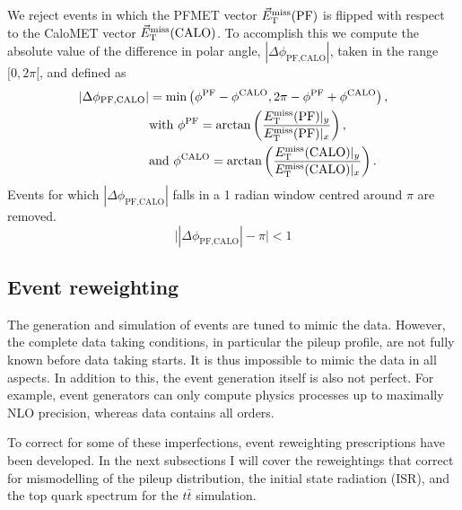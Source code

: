 We reject events in which the PFMET vector ${\vec E}_{\mathrm{T}}^{\text{miss}}(\textrm{PF})$ is flipped with
respect to the CaloMET vector ${\vec E}_{\mathrm{T}}^{\text{miss}}(\textrm{CALO})$. 
To accomplish this we compute the absolute value of the difference in polar angle,
 $|\Delta\phi_{\textrm{PF,CALO}}|$, taken in the range $[0,2\pi[$, and defined as
\begin{align}
|\Delta\phi_{\textrm{PF,CALO}}| &= \min \left ( \phi^{\textrm{PF}} - \phi^{\textrm{CALO}},   2\pi -
\phi^{\textrm{PF}} + \phi^{\textrm{CALO}} \right) ,\\
&\textrm{with } \phi^{\textrm{PF}} = \textrm{arctan} \left( \frac{E_{\mathrm{T}}^{\text{miss}}(\textrm{PF})|_y}
{E_{\mathrm{T}}^{\text{miss}}(\textrm{PF})|_x} \right) , \\
&\textrm{and } \phi^{\textrm{CALO}} = \textrm{arctan}\left( \frac{E_{\mathrm{T}}^{\text{miss}}(\textrm{CALO})|_y}
{E_{\mathrm{T}}^{\text{miss}}(\textrm{CALO})|_x} \right) .
\end{align}
Events for which $|\Delta\phi_{\textrm{PF,CALO}}|$ falls in a 1 radian window centred around $\pi$
are removed. 
\begin{equation}
\bigl| |\Delta\phi_{\textrm{PF,CALO}}| - \pi \bigr| < 1
\label{eqn:dphicut}
\end{equation}


\subsection{Event reweighting \label{sec:event_reweighting}}

The generation and simulation of events are tuned to mimic the data. However, the complete data
taking conditions, in particular the pileup profile, are not fully known before data
taking starts. It is thus impossible to mimic the data in all aspects. 
In addition to this, the event generation itself is also not perfect. For example, event generators
can only compute physics processes up to maximally NLO precision, whereas data contains all orders. 

To correct for some of these imperfections, event reweighting prescriptions have been developed. 
In the next subsections I will cover the reweightings that correct for mismodelling of the pileup
distribution, the initial state radiation (ISR), and the top quark \pt spectrum for the
$t\bar{t}$ simulation.


